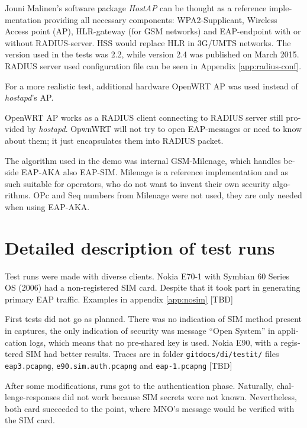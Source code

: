 \documentclass[12pt,a4paper,english]{tutthesis}
\begin{document}
\begin{otherlanguage}{english}
Jouni Malinen's software package \emph{HostAP}\cite{hostapd} can be thought
 as a reference
implementation providing all necessary components: WPA2-Supplicant, Wireless
Access point (AP), HLR-gateway (for GSM networks) and EAP-endpoint with
or without RADIUS-server. HSS would replace HLR in 3G/UMTS networks.
The version used in the tests was 2.2, while version
2.4 was published on March 2015. RADIUS server used configuration file
 can be seen in Appendix \ref{app:radius-conf}.


For a more realistic test, additional hardware OpenWRT AP was used instead of \emph{hostapd}'s
AP.

OpenWRT AP works as a RADIUS client connecting to RADIUS server still
provided by  \emph{hostapd}.
OpwnWRT will not try to open EAP-messages or need
to know about them; it just encapsulates them into RADIUS packet.


The algorithm used in the demo was internal GSM-Milenage,
which handles beside EAP-AKA also EAP-SIM.
Milenage is a reference implementation and as such suitable for operators, who do not 
want to invent their own security algorithms. OPc and Seq numbers from
Milenage were not used, they are only needed when using EAP-AKA. 

\section{Detailed description of test runs}
\label{sec-5-2}






Test runs were made with diverse clients.
Nokia E70-1 with Symbian 60 Series OS (2006) had a
non-registered SIM card. Despite that it took part in generating
primary EAP traffic.
Examples in appendix \ref{app:nosim}   [TBD]

First tests 
did not go as planned. There was no indication of SIM method
present in captures, the only indication of security was message
``Open System'' in application logs, which means that no pre-shared
key is used.
Nokia E90, with a registered SIM had better results. Traces
are in folder \verb~gitdocs/di/testit/~ files \verb~eap3.pcapng~,
  \verb~e90.sim.auth.pcapng~ and \verb~eap-1.pcapng~  [TBD]

After some modifications, runs got to the authentication phase.
Naturally, challenge-responses did not work because SIM secrets were
not known. Nevertheless, both card succeeded to the point, where MNO's
message would be verified with the SIM card.


\end{otherlanguage}
\end{document}
